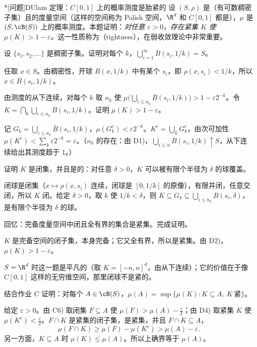 \begin{probleme}*[问题]{D}{Ulam 定理：$C[0,1]$ 上的概率测度是胎紧的}
设 $(S,\rho)$ 是（有可数稠密子集）且的度量空间（这样的空间称为 Polish 空间，$\R^d$ 和 $C[0,1]$ 都是），$\mu$ 是 $(S,\cB(S))$ 上的概率测度。本题证明：\emph{对任意 $\varepsilon>0$，存在紧集 $K$ 使 $\mu(K)>1-\varepsilon$。}这一性质称为（tightness），在弱收敛理论中非常重要。
\begin{questions}
\item 设 $\{s_1,s_2,\dots\}$ 是稠密子集。证明对每个 $k$，$\bigcup_{i=1}^\infty\overline B(s_i,1/k)=S$。
\begin{solution}
任取 $x\in S$。由稠密性，开球 $B(x,1/k)$ 中有某个 $s_i$，即 $\rho(x,s_i)<1/k$，所以 $x\in\overline B(s_i,1/k)$。
\end{solution}
\item 由测度的从下连续，对每个 $k$ 取 $n_k$ 使 $\mu\bigl(\bigcup_{i\leqslant n_k}\overline B(s_i,1/k)\bigr)>1-\varepsilon2^{-k}$。令 $K=\bigcap_k\bigcup_{i\leqslant n_k}\overline B(s_i,1/k)$。证明 $\mu(K)>1-\varepsilon$。
\begin{solution}
记 $G_k=\bigcup_{i\leqslant n_k}\overline B(s_i,1/k)$，$\mu(G_k^c)<\varepsilon2^{-k}$。$K^c=\bigcup_kG_k^c$，由次可加性 $\mu(K^c)<\sum_k\varepsilon2^{-k}=\varepsilon$。（$n_k$ 的存在：由 D1)，$\bigcup_{i\leqslant n}\overline B(s_i,1/k)\uparrow S$，从下连续给出其测度趋于 $1$。）
\end{solution}
\item 证明 $K$ 是闭集，并且是的：对任意 $\delta>0$，$K$ 可以被有限个半径为 $\delta$ 的球覆盖。
\begin{solution}
闭球是闭集（$x\mapsto\rho(x,s_i)$ 连续，闭球是 $[0,1/k]$ 的原像），有限并闭，任意交闭，所以 $K$ 闭。给定 $\delta>0$，取 $k$ 使 $1/k<\delta$，则 $K\subseteq G_k\subseteq\bigcup_{i\leqslant n_k}B(s_i,\delta)$，是有限个半径为 $\delta$ 的球。
\end{solution}
\item 回忆：完备度量空间中闭且全有界的集合是紧集。完成证明。
\begin{solution}
$K$ 是完备空间的闭子集，本身完备；它又全有界，所以是紧集。由 D2)，$\mu(K)>1-\varepsilon$。

$S=\R^d$ 时这一题是平凡的（取 $K=[-n,n]^d$，由从下连续）；它的价值在于像 $C[0,1]$ 这样的无穷维空间，那里闭球不是紧的。
\end{solution}
\item 结合作业 C 证明：对每个 $A\in\cB(S)$，$\mu(A)=\sup\{\mu(K):K\subseteq A,\ K\ \text{紧}\}$。
\begin{solution}
给定 $\varepsilon>0$。由 C6) 取闭集 $F\subseteq A$ 使 $\mu(F)>\mu(A)-\frac\varepsilon2$；由 D4) 取紧集 $K$ 使 $\mu(K^c)<\frac\varepsilon2$。$F\cap K$ 是紧集的闭子集，是紧集，并且 $F\cap K\subseteq A$，
\[
\mu(F\cap K)\geqslant\mu(F)-\mu(K^c)>\mu(A)-\varepsilon.
\]
另一方面，$K\subseteq A$ 时 $\mu(K)\leqslant\mu(A)$。所以上确界等于 $\mu(A)$。
\end{solution}
\end{questions}
\end{probleme}

